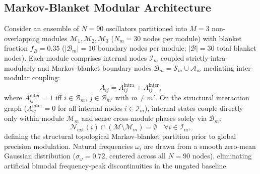 \documentclass[11pt,a4paper]{article}
\begin{document}
\subsection{Markov-Blanket Modular Architecture}
Consider an ensemble of $N = 90$ oscillators partitioned into $M = 3$ non-overlapping modules $\mathcal{M}_1, \mathcal{M}_2, \mathcal{M}_3$ ($N_m = 30$ nodes per module) with blanket fraction $f_B = 0.35$ ($|\mathcal{B}_m| = 10$ boundary nodes per module; $|\mathcal{B}| = 30$ total blanket nodes). Each module comprises internal nodes $\mathcal{I}_m$ coupled strictly intra-modularly and Markov-blanket boundary nodes $\mathcal{B}_m = \mathcal{S}_m \cup \mathcal{A}_m$ mediating inter-modular coupling:
\begin{equation}
    A_{ij} = A_{ij}^{\text{intra}} + A_{ij}^{\text{inter}},
\end{equation}
where $A_{ij}^{\text{inter}} = 1$ iff $i \in \mathcal{B}_m$, $j \in \mathcal{B}_{m'}$ with $m \neq m'$. On the structural interaction graph ($A_{ij}^{\text{inter}} = 0$ for all internal nodes $i \in \mathcal{I}_m$), internal states couple directly only within module $\mathcal{M}_m$ and sense cross-module phases solely via $\mathcal{B}_m$:
\begin{equation}
    \mathcal{N}_{\mathrm{ext}}(i) \cap (\mathcal{M} \setminus \mathcal{M}_m) = \emptyset \quad \forall i \in \mathcal{I}_m,
\end{equation}
defining the structural topological Markov-blanket partition prior to global precision modulation. Natural frequencies $\omega_i$ are drawn from a smooth zero-mean Gaussian distribution ($\sigma_\omega = 0.72$, centered across all $N = 90$ nodes), eliminating artificial bimodal frequency-peak discontinuities in the ungated baseline.
\end{document}
